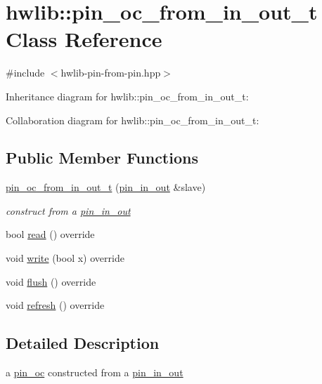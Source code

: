 \hypertarget{classhwlib_1_1pin__oc__from__in__out__t}{}\section{hwlib\+:\+:pin\+\_\+oc\+\_\+from\+\_\+in\+\_\+out\+\_\+t Class Reference}
\label{classhwlib_1_1pin__oc__from__in__out__t}


{\ttfamily \#include $<$hwlib-\/pin-\/from-\/pin.\+hpp$>$}



Inheritance diagram for hwlib\+:\+:pin\+\_\+oc\+\_\+from\+\_\+in\+\_\+out\+\_\+t\+:


Collaboration diagram for hwlib\+:\+:pin\+\_\+oc\+\_\+from\+\_\+in\+\_\+out\+\_\+t\+:
\subsection*{Public Member Functions}
\begin{DoxyCompactItemize}
\item 
\mbox{\label{classhwlib_1_1pin__oc__from__in__out__t_a12ec96cd181d347f438a0bbaef6014b6}} 
\hyperlink{classhwlib_1_1pin__oc__from__in__out__t_a12ec96cd181d347f438a0bbaef6014b6}{pin\+\_\+oc\+\_\+from\+\_\+in\+\_\+out\+\_\+t} (\hyperlink{classhwlib_1_1pin__in__out}{pin\+\_\+in\+\_\+out} \&slave)
\begin{DoxyCompactList}\small\item\em construct from a \hyperlink{classhwlib_1_1pin__in__out}{pin\+\_\+in\+\_\+out} \end{DoxyCompactList}\item 
bool \hyperlink{classhwlib_1_1pin__oc__from__in__out__t_ae1e2dcf630d637e8d31e9942f7323a2b}{read} () override
\item 
void \hyperlink{classhwlib_1_1pin__oc__from__in__out__t_a5bd43e42810402353b4e902579055ef0}{write} (bool x) override
\item 
void \hyperlink{classhwlib_1_1pin__oc__from__in__out__t_add08ce2c564c20a9aea9bac915123929}{flush} () override
\item 
void \hyperlink{classhwlib_1_1pin__oc__from__in__out__t_a99df420aaed9a39dad71658b9483c002}{refresh} () override
\end{DoxyCompactItemize}


\subsection{Detailed Description}
a \hyperlink{classhwlib_1_1pin__oc}{pin\+\_\+oc} constructed from a \hyperlink{classhwlib_1_1pin__in__out}{pin\+\_\+in\+\_\+out}

